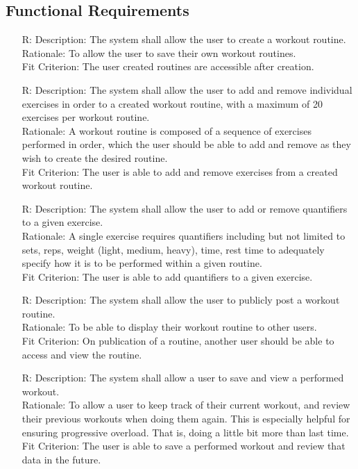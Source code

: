 \documentclass[12pt]{article}
\newcounter{reqnum} %
\begin{document}
\subsection{Functional Requirements}
\noindent \begin{itemize}

\item[R\refstepcounter{reqnum}\thereqnum \label{R_Inputs}:]
Description: The system shall allow the user to create a workout routine.
\\ Rationale: To allow the user to save their own workout routines.
\\ Fit Criterion: The user created routines are accessible after creation.

\item[R\refstepcounter{reqnum}\thereqnum \label{R_Inputs}:]
Description: The system shall allow the user to add and remove individual exercises in order to a created workout routine, with a maximum of 20 exercises per workout routine.
\\ Rationale: A workout routine is composed of a sequence of exercises performed in order, which the user should be able to add and remove as they wish to create the desired routine.
\\ Fit Criterion: The user is able to add and remove exercises from a created workout routine.

\item[R\refstepcounter{reqnum}\thereqnum \label{R_Inputs}:]
Description: The system shall allow the user to add or remove quantifiers to a given exercise.
\\ Rationale: A single exercise requires quantifiers including but not limited to sets, reps, weight (light, medium, heavy), time, rest time to adequately specify how it is to be performed within a given routine.
\\ Fit Criterion: The user is able to add quantifiers to a given exercise.

\item[R\refstepcounter{reqnum}\thereqnum \label{R_Inputs}:]
Description: The system shall allow the user to publicly post a workout routine.
\\ Rationale: To be able to display their workout routine to other users.
\\ Fit Criterion: On publication of a routine, another user should be able to access and view the routine.


\item[R\refstepcounter{reqnum}\thereqnum \label{R_Inputs}:]
Description: The system shall allow a user to save and view a performed workout.
\\ Rationale: To allow a user to keep track of their current workout, and review their previous workouts when doing them again.
This is especially helpful for ensuring progressive overload. That is, doing a little bit more than last time.
\\ Fit Criterion: The user is able to save a performed workout and review that data in the future.


\end{itemize}
\end{document}
